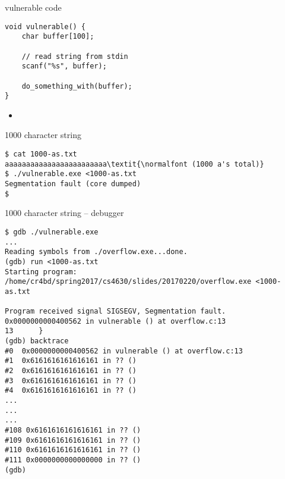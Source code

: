 
\begin{frame}[fragile,label=vulnCAgain]{vulnerable code}
\lstset{language=C,style=small}
\begin{lstlisting}
void vulnerable() {
    char buffer[100];

    // read string from stdin
    scanf("%s", buffer);

    do_something_with(buffer);
}
\end{lstlisting}
\begin{itemize}
\item<2> 
\end{itemize}
\end{frame}


\begin{frame}[fragile,label=charSegfault]{1000 character string}
\begin{Verbatim}[fontsize=\fontsize{9}{10}\selectfont,commandchars=\\\{\}]
$ cat 1000-as.txt
aaaaaaaaaaaaaaaaaaaaaaaa\textit{\normalfont (1000 a's total)}
$ ./vulnerable.exe <1000-as.txt
Segmentation fault (core dumped)
$ 
\end{Verbatim}
\end{frame}


\begin{frame}[fragile,label=charDebug]{1000 character string -- debugger}
\begin{Verbatim}[fontsize=\fontsize{9}{10}\selectfont,commandchars=\\\[\]]
$ gdb ./vulnerable.exe 
...
Reading symbols from ./overflow.exe...done.
(gdb) run <1000-as.txt 
Starting program: /home/cr4bd/spring2017/cs4630/slides/20170220/overflow.exe <1000-as.txt

Program received signal SIGSEGV, Segmentation fault.
0x0000000000400562 in vulnerable () at overflow.c:13
13      }
(gdb) backtrace
#0  0x0000000000400562 in vulnerable () at overflow.c:13
#1  0x6161616161616161 in ?? ()
#2  0x6161616161616161 in ?? ()
#3  0x6161616161616161 in ?? ()
#4  0x6161616161616161 in ?? ()
...
...
...
#108 0x6161616161616161 in ?? ()
#109 0x6161616161616161 in ?? ()
#110 0x6161616161616161 in ?? ()
#111 0x0000000000000000 in ?? ()
(gdb) 
\end{Verbatim}
\end{frame}

